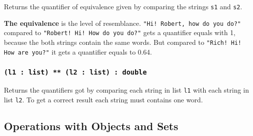 Returns the quantifier of equivalence given by comparing the strings \texttt{s1} and \texttt{s2}.

{\bf The equivalence} is the level of resemblance. \texttt{"Hi! Robert, how do you do?"} compared to \texttt{"Robert! Hi! How do you do?"} gets a quantifier equals with 1, because the both strings contain the same words. But compared to \texttt{"Rich! Hi! How are you?"} it gets a quantifier equals to 0.64.

\subsubsection{\texttt{(l1 : list) ** (l2 : list) : double}}

Returns the quantifiers got by comparing each string in list \texttt{l1} with each string in list \texttt{l2}. To get a correct result each string must contains one word.

\subsection{Operations with Objects and Sets}

